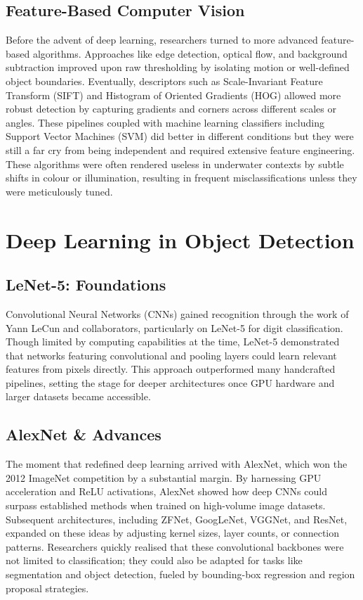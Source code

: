 \subsection{Feature-Based Computer Vision}
Before the advent of deep learning, researchers turned to more advanced feature-based algorithms. Approaches like edge detection, optical flow, and background subtraction improved upon raw thresholding by isolating motion or well-defined object boundaries. Eventually, descriptors such as Scale-Invariant Feature Transform (SIFT) and Histogram of Oriented Gradients (HOG) allowed more robust detection by capturing gradients and corners across different scales or angles. These pipelines coupled with machine learning classifiers including Support Vector Machines (SVM) did better in different conditions but they were still a far cry from being independent and required extensive feature engineering. These algorithms were often rendered useless in underwater contexts by subtle shifts in colour or illumination, resulting in frequent misclassifications unless they were meticulously tuned.

\section{Deep Learning in Object Detection}
\subsection{LeNet-5: Foundations}
Convolutional Neural Networks (CNNs) gained recognition through the work of Yann LeCun and collaborators, particularly on LeNet-5 for digit classification. Though limited by computing capabilities at the time, LeNet-5 demonstrated that networks featuring convolutional and pooling layers could learn relevant features from pixels directly. This approach outperformed many handcrafted pipelines, setting the stage for deeper architectures once GPU hardware and larger datasets became accessible.
\subsection{AlexNet \& Advances}
The moment that redefined deep learning arrived with AlexNet, which won the 2012 ImageNet competition by a substantial margin. By harnessing GPU acceleration and ReLU activations, AlexNet showed how deep CNNs could surpass established methods when trained on high-volume image datasets. Subsequent architectures, including ZFNet, GoogLeNet, VGGNet, and ResNet, expanded on these ideas by adjusting kernel sizes, layer counts, or connection patterns. Researchers quickly realised that these convolutional backbones were not limited to classification; they could also be adapted for tasks like segmentation and object detection, fueled by bounding-box regression and region proposal strategies.
